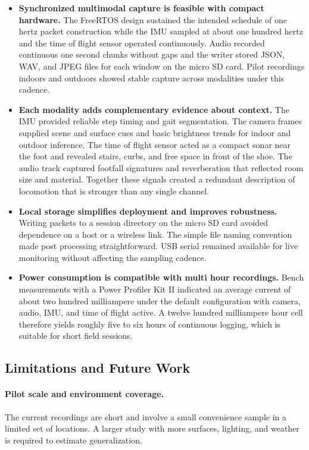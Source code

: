 \documentclass[manuscript,review,anonymous]{acmart}
\begin{document}
\begin{itemize}
  \item \textbf{Synchronized multimodal capture is feasible with compact hardware.}
        The FreeRTOS design sustained the intended schedule of one hertz packet construction while the IMU sampled at about one hundred hertz and the time of flight sensor operated continuously. Audio recorded continuous one second chunks without gaps and the writer stored JSON, WAV, and JPEG files for each window on the micro SD card. Pilot recordings indoors and outdoors showed stable capture across modalities under this cadence.

  \item \textbf{Each modality adds complementary evidence about context.}
        The IMU provided reliable step timing and gait segmentation. The camera frames supplied scene and surface cues and basic brightness trends for indoor and outdoor inference. The time of flight sensor acted as a compact sonar near the foot and revealed stairs, curbs, and free space in front of the shoe. The audio track captured footfall signatures and reverberation that reflected room size and material. Together these signals created a redundant description of locomotion that is stronger than any single channel.

  \item \textbf{Local storage simplifies deployment and improves robustness.}
        Writing packets to a session directory on the micro SD card avoided dependence on a host or a wireless link. The simple file naming convention made post processing straightforward. USB serial remained available for live monitoring without affecting the sampling cadence.

  \item \textbf{Power consumption is compatible with multi hour recordings.}
        Bench measurements with a Power Profiler Kit II indicated an average current of about two hundred milliampere under the default configuration with camera, audio, IMU, and time of flight active. A twelve hundred milliampere hour cell therefore yields roughly five to six hours of continuous logging, which is suitable for short field sessions.
\end{itemize}

\subsection{Limitations and Future Work}

\paragraph{Pilot scale and environment coverage.}
The current recordings are short and involve a small convenience sample in a limited set of locations. A larger study with more surfaces, lighting, and weather is required to estimate generalization.
\end{document}
